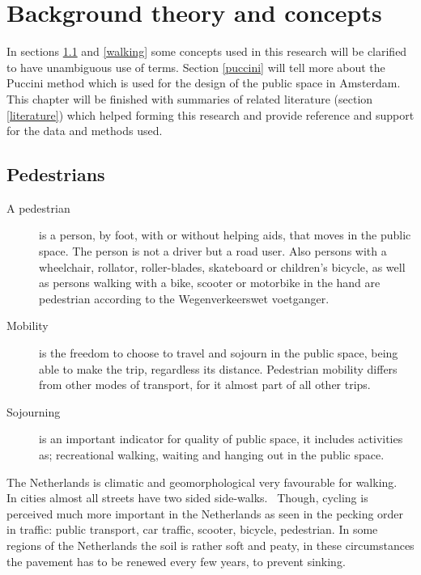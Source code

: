 \chapter[Background theory and concepts]{Background theory and concepts}
In sections \ref{pedestrians} and \ref{walking} some concepts used in this research will be clarified to have unambiguous use of terms. Section \ref{puccini} will tell more about the Puccini method which is used for the design of the public space in Amsterdam. 
This chapter will be finished with summaries of related literature (section \ref{literature}) which helped forming this research and provide reference and support for the data and methods used.

\section[Pedestrians]{Pedestrians}\label{pedestrians}
\begin{description}\item[A pedestrian] is a person, by foot, with or without helping aids, that moves in the public space. The person is not a driver but a road user. Also persons with a wheelchair, rollator, roller-blades, skateboard or children's bicycle, as well as persons walking with a bike, scooter or motorbike in the hand are pedestrian according to the Wegenverkeerswet voetganger.~\cite{Crow2014}
\item[Mobility] is the freedom to choose to travel and sojourn in the public space, being able to make the trip, regardless its distance. Pedestrian mobility differs from other modes of transport, for it almost part of all other trips.~\cite{Sauter2010}
\item[Sojourning] is an important indicator for quality of public space, it includes activities as; recreational walking, waiting and hanging out in the public space.~\cite{Sauter2010} \end{description}

The Netherlands is climatic and geomorphological very favourable for walking.~\cite{Sauter2010} In cities almost all streets have two sided side-walks.~\cite{Sauter2010} Though, cycling is perceived much more important in the Netherlands as seen in the pecking order in traffic: public transport, car traffic, scooter, bicycle, pedestrian. In some regions of the Netherlands the soil is rather soft and peaty, in these circumstances the pavement has to be renewed every few years, to prevent sinking.

